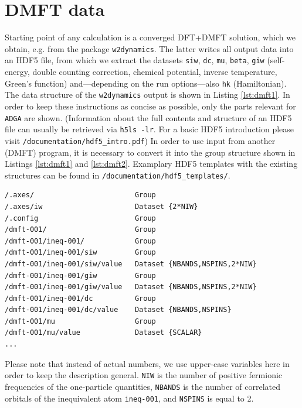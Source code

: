 \documentclass[a4paper,11pt]{article}
\numberwithin{equation}{section} %
\begin{document}
\section{DMFT data}
Starting point of any calculation is a converged DFT+DMFT solution, which we obtain, e.g. from the package
\verb|w2dynamics|. The latter writes all output data into an HDF5 file, from which we extract the datasets \verb|siw|, \verb|dc|, \verb|mu|,
\verb|beta|, \verb|giw| (self-energy, double counting correction, chemical potential, inverse temperature, Green's function)
and---depending on the run options---also \verb|hk| (Hamiltonian).
The data structure of the \verb|w2dynamics| output is shown in Listing \ref{lst:dmft1}.
In order to keep these instructions as concise as possible, only the parts relevant for \verb+ADGA+ are shown.
(Information about the full contents and structure of an HDF5 file can usually be retrieved via  \verb|h5ls -lr|. For a basic HDF5 introduction
please visit  {\color{blue}\verb+/documentation/hdf5_intro.pdf+}) In order to use
input from another (DMFT) program, it is necessary to convert it into the group structure
shown in Listings \ref{lst:dmft1} and \ref{lst:dmft2}.
Examplary HDF5 templates with the existing structures can be found in {\color{blue}\verb+/documentation/hdf5_templates/+}.
\newpage
\begin{lstlisting}[caption=HDF5-structure of the DMFT output, frame=single, basicstyle=\small, label={lst:dmft1}]
/.axes/                        Group
/.axes/iw                      Dataset {2*NIW}
/.config                       Group
/dmft-001/                     Group
/dmft-001/ineq-001/            Group
/dmft-001/ineq-001/siw         Group
/dmft-001/ineq-001/siw/value   Dataset {NBANDS,NSPINS,2*NIW}
/dmft-001/ineq-001/giw         Group
/dmft-001/ineq-001/giw/value   Dataset {NBANDS,NSPINS,2*NIW}
/dmft-001/ineq-001/dc          Group
/dmft-001/ineq-001/dc/value    Dataset {NBANDS,NSPINS}
/dmft-001/mu                   Group
/dmft-001/mu/value             Dataset {SCALAR}
...
\end{lstlisting}
Please note that instead of actual numbers, we use upper-case variables here in order to keep
the description general. \verb|NIW| is the number of positive fermionic frequencies of the one-particle quantities,
\verb|NBANDS| is the number of correlated orbitals of the inequivalent atom \verb|ineq-001|, and \verb|NSPINS| is equal to 2.
\end{document}
